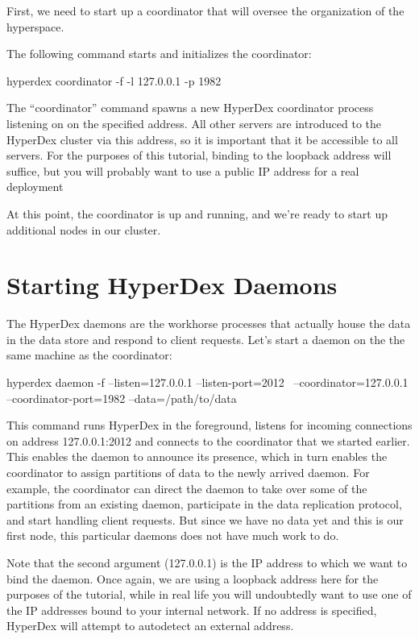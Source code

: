First, we need to start up a coordinator that will oversee the organization of
the hyperspace.

The following command starts and initializes the coordinator:

\begin{consolecode}
hyperdex coordinator -f -l 127.0.0.1 -p 1982
\end{consolecode}

The ``coordinator'' command spawns a new HyperDex coordinator process listening
on on the specified address.  All other servers are introduced to the HyperDex
cluster via this address, so it is important that it be accessible to all
servers.  For the purposes of this tutorial, binding to the loopback address
will suffice, but you will probably want to use a public IP address for a real
deployment

At this point, the coordinator is up and running, and we're ready to start up
additional nodes in our cluster.

\section{Starting HyperDex Daemons}
\label{sec:quick-start:daemon}

The HyperDex daemons are the workhorse processes that actually house the data in
the data store and respond to client requests. Let's start a daemon on the the
same machine as the coordinator:

\begin{consolecode}
hyperdex daemon -f --listen=127.0.0.1 --listen-port=2012 \
                   --coordinator=127.0.0.1 --coordinator-port=1982 --data=/path/to/data
\end{consolecode}

This command runs HyperDex in the foreground, listens for incoming connections
on address 127.0.0.1:2012 and connects to the coordinator that we started
earlier.  This enables the daemon to announce its presence, which in turn
enables the coordinator to assign partitions of data to the newly arrived
daemon.  For example, the coordinator can direct the daemon to take over some of
the partitions from an existing daemon, participate in the data replication
protocol, and start handling client requests.  But since we have no data yet and
this is our first node, this particular daemons does not have much work to do.

Note that the second argument (127.0.0.1) is the IP address to which we want to
bind the daemon.  Once again, we are using a loopback address here for the
purposes of the tutorial, while in real life you will undoubtedly want to use
one of the IP addresses bound to your internal network.  If no address is
specified, HyperDex will attempt to autodetect an external address.

